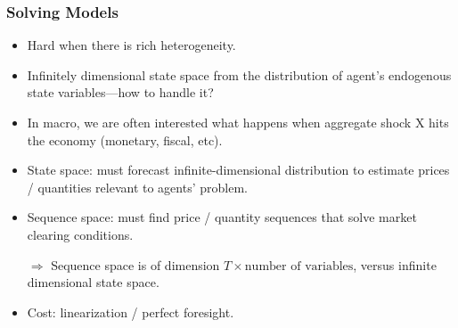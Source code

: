 \documentclass[english,xcolor=svgnames]{beamer}
\begin{document}
\begin{frame}
    \frametitle{Solving Models}
    \begin{itemize}
        \item Hard when there is rich heterogeneity.
        \item Infinitely dimensional state space from the distribution of agent's endogenous state variables---how to handle it?
        \item In macro, we are often interested what happens when aggregate shock X hits the economy (monetary, fiscal, etc).
        \item State space: must forecast infinite-dimensional distribution to estimate prices / quantities relevant to agents' problem.
        \item Sequence space: must find price / quantity sequences that solve market clearing conditions.
        \item[$\Rightarrow$] Sequence space is of dimension $T \times \text{number of variables}$, versus infinite dimensional state space. 
       	\item Cost: linearization / perfect foresight.
    \end{itemize}
\end{frame}
\end{document}
